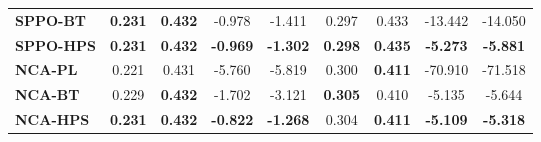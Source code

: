 \begin{table*}[t]
{\begin{tabular}{l|cccc|cccc}
\textbf{SPPO-BT} & \textbf{0.231} & \textbf{{0.432}} & -0.978 & -1.411 & 0.297 & 0.433 & -13.442 & -14.050 \\
\rowcolor{mygray}
\textbf{SPPO-HPS} & \textbf{0.231} & \textbf{{0.432}} & \textbf{-0.969} & \textbf{-1.302} & \textbf{0.298} & \textbf{{0.435}} & \textbf{-5.273} & \textbf{-5.881} \\
\midrule
\textbf{NCA-PL} & 0.221 & 0.431 & -5.760 &	-5.819 & 0.300 & \textbf{0.411} & -70.910 & -71.518 \\
\textbf{NCA-BT} & 0.229 & \textbf{{0.432}} & -1.702 & -3.121 & \textbf{0.305} & 0.410 & -5.135 & -5.644 \\
\rowcolor{mygray}
\textbf{NCA-HPS} & \textbf{0.231} & \textbf{{0.432}} & \textbf{-0.822} & \textbf{-1.268} & 0.304 & \textbf{0.411} & \textbf{{-5.109}} & \textbf{{-5.318}} \\
\bottomrule
\end{tabular}}
\vspace{-1.0em}
\end{table*}
